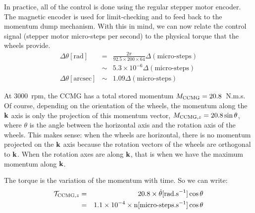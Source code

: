 In practice, all of the control is done using the regular stepper motor encoder. The magnetic encoder is used for limit-checking and to feed back to the momentum dump mechanism. With this in mind, we can now relate the control signal (stepper motor micro-steps per second) to the physical torque that the wheels provide. 
\begin{eqnarray}
\Delta\theta[\textrm{rad}] &= &\frac{2\pi}{92.5\times 200\times 64}\Delta(\textrm{micro-steps}) \\ 
& \sim & 5.3\times 10^{-6} \Delta(\textrm{micro-steps})\\
\Delta\theta[\textrm{arcsec}] &\sim &  1.09 \Delta(\textrm{micro-steps})
\end{eqnarray}

At 3000~rpm, the CCMG has a total stored momentum $M_{\textrm{CCMG}} = 20.8$~N.m.s. Of course, depending on the orientation of the wheels, the momentum along the $\textrm{\textbf{k}}$ axis is only the projection of this momentum vector, $M_{\textrm{CCMG},z} = 20.8\sin\theta$, where $\theta$ is the angle between the horizontal axis and the rotation axis of the wheels. This makes sense: when the wheels are horizontal, there is no momentum projected on the $\textrm{\textbf{k}}$ axis because the rotation vectors of the wheels are orthogonal to $\textrm{\textbf{k}}$. When the rotation axes are along $\textrm{\textbf{k}}$, that is when we have the maximum momentum along $\textrm{\textbf{k}}$. 

The torque is the variation of the momentum with time. So we can write:
\begin{eqnarray}
\mathcal{T}_{\textrm{CCMG},z} &= & 20.8\times \dot{\theta}[\textrm{rad.s}^{-1}] \cos\theta\\
 &= & 1.1\times 10^{-4}\times \textrm{n}[\textrm{micro-steps.s}^{-1}]\cos\theta
\end{eqnarray}

\begin{figure}[!ht]
	\centering
	
	\caption{}
	\label{fig:CCMGnocase}
    \end{figure}

